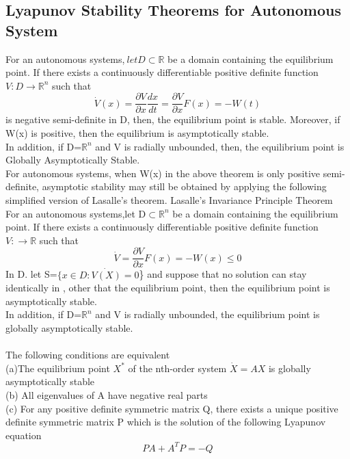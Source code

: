 \documentclass[a4paper,12pt]{report}
\numberwithin{equation}{section}
\begin{document}
\subsection{Lyapunov Stability Theorems for Autonomous System}
 \theorem For an autonomous systems,$ \ let D \subset \mathbb{R}$ be a domain containing the equilibrium point. If there exists a continuously differentiable positive definite function $V:D \to \mathbb{R}^n$ such that 
 \begin{equation}
 \dot{V}(x)= \frac{\partial V}{\partial x} \frac{dx}{dt}= \frac{\partial V}{\partial x}F(x) = -W(t)
\end{equation}  
is negative semi-definite in D, then, the equilibrium point is stable. Moreover, if W(x) is positive, then the equilibrium is asymptotically stable. \\
In addition, if D=$\mathbb{R}^n$ and V is radially unbounded, then, the equilibrium point is Globally Asymptotically Stable.\\ 
For autonomous systems, when W(x) in the above theorem is only positive semi-definite,              
 asymptotic stability may still be obtained by applying the following simplified version of Lasalle's theorem.
\theorem Lasalle's Invariance Principle Theorem \\
For an autonomous systems,let D$\subset\mathbb{R}^n $ be a domain containing the equilibrium point. If there exists a continuously differentiable positive definite  function $V:\to \mathbb{R}$ such that 
\begin{equation}
\dot{V}=\frac{\partial V}{\partial x}F(x)=-W(x)\leq 0  
\end{equation}
In D. let S=$\{x\in D:\dot {V(X)}=0$\} and suppose that no solution can stay identically in , other that the equilibrium point, then the equilibrium point is asymptotically stable.\\
In addition, if D=$ \mathbb{R}^n$ and V is radially unbounded, the equilibrium point is globally asymptotically stable. \\ \\
\theorem The following conditions are equivalent \\
(a)The equilibrium point $X^*$ of the nth-order system $\dot{X}=AX $ is globally asymptotically stable \\
(b) All eigenvalues of A have negative real parts \\
(c) For any positive definite symmetric matrix Q, there exists a unique positive definite symmetric matrix P which is the solution of the following Lyapunov equation
\begin{equation}
PA+A^{T}P=-Q
\end{equation} 
\end{document}
